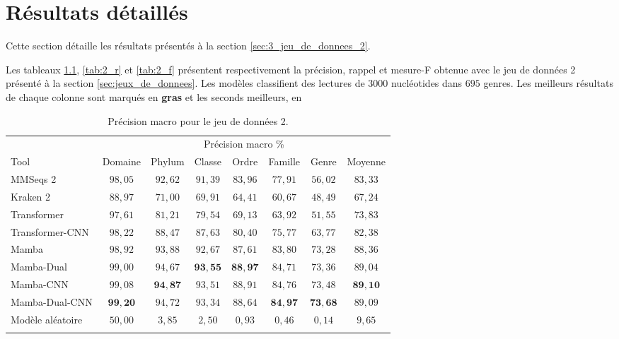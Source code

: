 \chapter{Résultats détaillés}
\label{sec:annexe}
Cette section détaille les résultats présentés à la section \ref{sec:3_jeu_de_donnees_2}.

Les tableaux \ref{tab:2_p}, \ref{tab:2_r} et \ref{tab:2_f} présentent respectivement la précision,
rappel et mesure-F obtenue avec le jeu de données 2 présenté à la section \ref{sec:jeux_de_donnees}.
Les modèles classifient des lectures de $3000$ nucléotides dans $695$ genres. Les meilleurs
résultats de chaque colonne sont marqués en \textbf{gras} et les seconds meilleurs, en

\begin{table}[hbt!]
\centering
\caption{
    Précision macro pour le jeu de données 2.
}
\begin{tabular}{lccccccc} \hline
       & \multicolumn{7}{c}{Précision macro \%}       \\ \cmidrule(lr){2-8}
Tool             & Domaine  & Phylum  & Classe & Ordre & Famille & Genre & Moyenne \\ \hline
MMSeqs 2         & $98,05$ & $92,62$ & $91,39$ & $83,96$ & $77,91$ & $56,02$ & $83,33$ \\
Kraken 2         & $88,97$ & $71,00$ & $69,91$ & $64,41$ & $60,67$ & $48,49$ & $67,24$ \\
Transformer      & $97,61$ & $81,21$ & $79,54$ & $69,13$ & $63,92$ & $51,55$ & $73,83$\\
Transformer-CNN  & $98,22$ & $88,47$ & $87,63$ & $80,40$ & $75,77$ & $63,77$ & $82,38$ \\
Mamba            & $98,92$ & $93,88$ & $92,67$ & $87,61$ & $83,80$ & $73,28$ & $88,36$ \\
Mamba-Dual       & $99,00$ & $94,67$ & $\mathbf{93,55}$ & $\mathbf{88,97}$ & $84,71$ & $73,36$ & $89,04$ \\
Mamba-CNN        & $\mathit{99,08}$ & $\mathbf{94,87}$ & $\mathit{93,51}$ & $\mathit{88,91}$ & $\mathit{84,76}$ & $\mathit{73,48}$ & $\mathbf{89,10}$ \\
Mamba-Dual-CNN   & $\mathbf{99,20}$ & $\mathit{94,72}$ & $93,34$ & $88,64$ & $\mathbf{84,97}$ & $\mathbf{73,68}$ & $\mathit{89,09}$ \\
\hline
Modèle aléatoire & $50,00$ & $3,85$  & $2,50$  & $0,93$ & $0,46$ & $0,14$  & $9,65$ \\
\hline
\label{tab:2_p}
\end{tabular}
\end{table}


